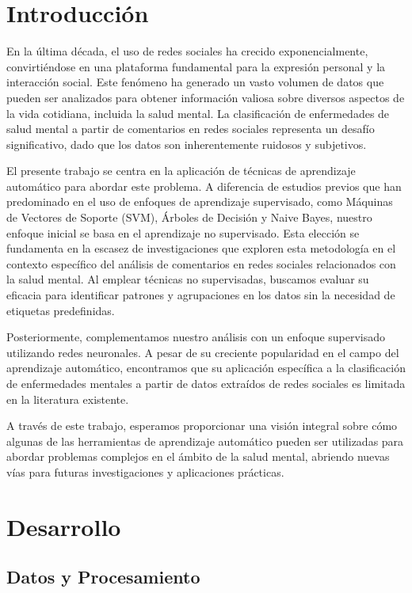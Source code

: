 \documentclass[
10pt, %
a4paper, %
oneside, %
headinclude,footinclude, %
BCOR5mm, %
]{scrartcl}
\begin{document}
\section{Introducción}

En la última década, el uso de redes sociales ha crecido exponencialmente, convirtiéndose en una plataforma fundamental 
para la expresión personal y la interacción social. Este fenómeno ha generado un vasto volumen de datos que pueden ser analizados 
para obtener información valiosa sobre diversos aspectos de la vida cotidiana, incluida la salud mental. La clasificación de enfermedades 
de salud mental a partir de comentarios en redes sociales representa un desafío significativo, dado que los datos son inherentemente ruidosos y subjetivos.

El presente trabajo se centra en la aplicación de técnicas de aprendizaje automático para abordar este problema. 
A diferencia de estudios previos que han predominado en el uso de enfoques de aprendizaje supervisado, como Máquinas de Vectores de Soporte (SVM), 
Árboles de Decisión y Naive Bayes, nuestro enfoque inicial se basa en el aprendizaje no supervisado. Esta elección se fundamenta en la escasez de investigaciones 
que exploren esta metodología en el contexto específico del análisis de comentarios en redes sociales relacionados con la salud mental. Al emplear técnicas no supervisadas, 
buscamos evaluar su eficacia para identificar patrones y agrupaciones en los datos sin la necesidad de etiquetas predefinidas.

Posteriormente, complementamos nuestro análisis con un enfoque supervisado utilizando redes neuronales. A pesar de su creciente popularidad en el campo del aprendizaje automático, 
encontramos que su aplicación específica a la clasificación de enfermedades mentales a partir de datos extraídos de redes sociales es limitada en la literatura existente. 
 
A través de este trabajo, esperamos proporcionar una visión integral sobre cómo algunas de las herramientas de aprendizaje automático pueden ser utilizadas para abordar problemas complejos en el ámbito de la salud mental, abriendo nuevas vías para futuras investigaciones y aplicaciones prácticas.

\section{Desarrollo}

\subsection{Datos y Procesamiento}
\end{document}
